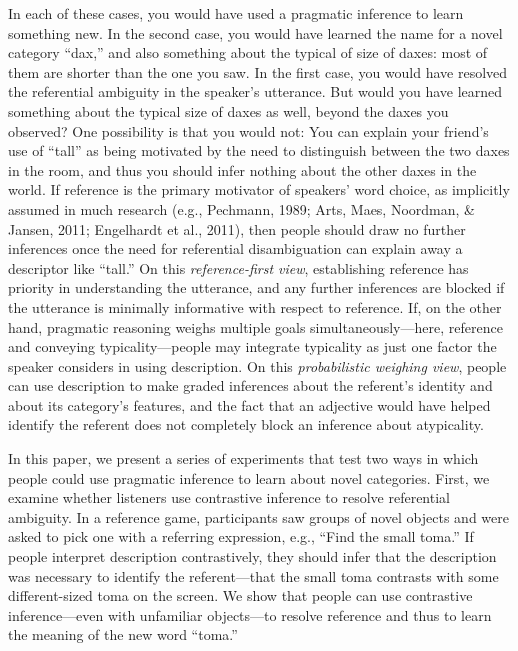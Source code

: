 \documentclass[
  english,
  man,floatsintext]{apa6}
\begin{document}
In each of these cases, you would have used a pragmatic inference to learn something new. In the second case, you would have learned the name for a novel category ``dax,'' and also something about the typical of size of daxes: most of them are shorter than the one you saw. In the first case, you would have resolved the referential ambiguity in the speaker's utterance. But would you have learned something about the typical size of daxes as well, beyond the daxes you observed? One possibility is that you would not: You can explain your friend's use of ``tall'' as being motivated by the need to distinguish between the two daxes in the room, and thus you should infer nothing about the other daxes in the world. If reference is the primary motivator of speakers' word choice, as implicitly assumed in much research (e.g., Pechmann, 1989; Arts, Maes, Noordman, \& Jansen, 2011; Engelhardt et al., 2011), then people should draw no further inferences once the need for referential disambiguation can explain away a descriptor like ``tall.'' On this \emph{reference-first view}, establishing reference has priority in understanding the utterance, and any further inferences are blocked if the utterance is minimally informative with respect to reference. If, on the other hand, pragmatic reasoning weighs multiple goals simultaneously---here, reference and conveying typicality---people may integrate typicality as just one factor the speaker considers in using description. On this \emph{probabilistic weighing view}, people can use description to make graded inferences about the referent's identity and about its category's features, and the fact that an adjective would have helped identify the referent does not completely block an inference about atypicality.

In this paper, we present a series of experiments that test two ways in which people could use pragmatic inference to learn about novel categories. First, we examine whether listeners use contrastive inference to resolve referential ambiguity. In a reference game, participants saw groups of novel objects and were asked to pick one with a referring expression, e.g., ``Find the small toma.'' If people interpret description contrastively, they should infer that the description was necessary to identify the referent---that the small toma contrasts with some different-sized toma on the screen. We show that people can use contrastive inference---even with unfamiliar objects---to resolve reference and thus to learn the meaning of the new word ``toma.''
\end{document}
